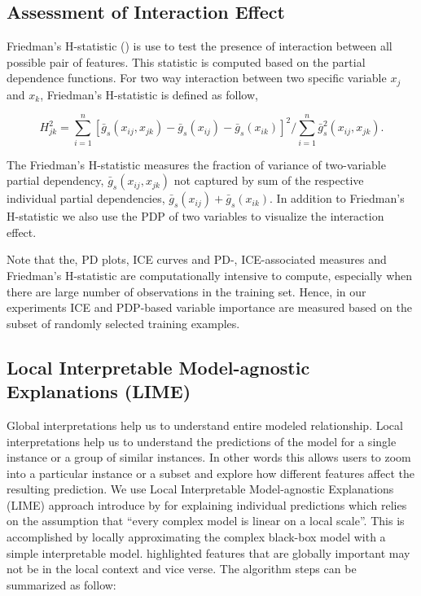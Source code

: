 \documentclass[11pt,a4paper,]{article}
\theoremstyle{definition}
\theoremstyle{definition}
\theoremstyle{definition}
\theoremstyle{remark}
\begin{document}
\subsection{Assessment of Interaction
Effect}\label{assessment-of-interaction-effect}

Friedman's H-statistic (\textcite{friedman2008predictive}) is use to
test the presence of interaction between all possible pair of features.
This statistic is computed based on the partial dependence functions.
For two way interaction between two specific variable \(x_j\) and
\(x_k\), Friedman's H-statistic is defined as follow,

\[H_{jk}^2=\sum_{i=1}^{n}[\bar{g}_{s}(x_{ij}, x_{jk})-\bar{g}_{s}(x_{ij})-\bar{g}_{s}(x_{ik})]^2/\sum_{i=1}^{n}\bar{g}^2_{s}(x_{ij}, x_{jk}).\]

The Friedman's H-statistic measures the fraction of variance of
two-variable partial dependency, \(\bar{g}_{s}(x_{ij}, x_{jk})\) not
captured by sum of the respective individual partial dependencies,
\(\bar{g}_{s}(x_{ij})+\bar{g}_{s}(x_{ik})\). In addition to Friedman's
H-statistic we also use the PDP of two variables to visualize the
interaction effect.

Note that the, PD plots, ICE curves and PD-, ICE-associated measures and
Friedman's H-statistic are computationally intensive to compute,
especially when there are large number of observations in the training
set. Hence, in our experiments ICE and PDP-based variable importance are
measured based on the subset of randomly selected training examples.

\subsection{Local Interpretable Model-agnostic Explanations
(LIME)}\label{local-interpretable-model-agnostic-explanations-lime}

Global interpretations help us to understand entire modeled
relationship. Local interpretations help us to understand the
predictions of the model for a single instance or a group of similar
instances. In other words this allows users to zoom into a particular
instance or a subset and explore how different features affect the
resulting prediction. We use Local Interpretable Model-agnostic
Explanations (LIME) approach introduce by \textcite{ribeiro2016should}
for explaining individual predictions which relies on the assumption
that ``every complex model is linear on a local scale''. This is
accomplished by locally approximating the complex black-box model with a
simple interpretable model. \textcite{ribeiro2016should} highlighted
features that are globally important may not be in the local context and
vice verse. The algorithm steps can be summarized as follow:
\end{document}
